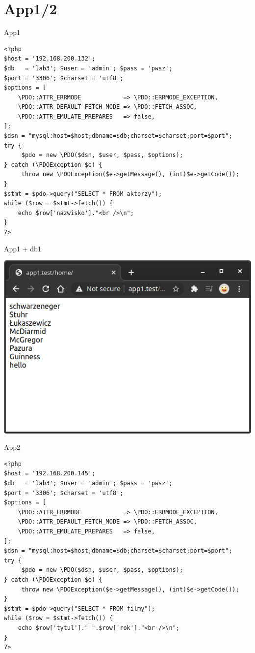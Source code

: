 \documentclass[presentation]{beamer}
\begin{document}
\section{App1/2}
\label{sec:orgb65ecbc}
\begin{frame}[label={sec:org920a3f6},fragile]{App1}
 \TINY
\begin{verbatim}
<?php
$host = '192.168.200.132';
$db   = 'lab3'; $user = 'admin'; $pass = 'pwsz';
$port = '3306'; $charset = 'utf8';
$options = [
    \PDO::ATTR_ERRMODE            => \PDO::ERRMODE_EXCEPTION,
    \PDO::ATTR_DEFAULT_FETCH_MODE => \PDO::FETCH_ASSOC,
    \PDO::ATTR_EMULATE_PREPARES   => false,
];
$dsn = "mysql:host=$host;dbname=$db;charset=$charset;port=$port";
try {
     $pdo = new \PDO($dsn, $user, $pass, $options);
} catch (\PDOException $e) {
     throw new \PDOException($e->getMessage(), (int)$e->getCode());
}
$stmt = $pdo->query("SELECT * FROM aktorzy");
while ($row = $stmt->fetch()) {
    echo $row['nazwisko']."<br />\n";
}
?>
\end{verbatim}
\end{frame}
\begin{frame}[label={sec:org1907d78}]{App1 + db1}
\begin{center}
\includegraphics[width=.9\linewidth]{./data/app/app1.png}
\end{center}
\end{frame}
\begin{frame}[label={sec:orgbbcd1e8},fragile]{App2}
 \TINY
\begin{verbatim}
<?php
$host = '192.168.200.145';
$db   = 'lab3'; $user = 'admin'; $pass = 'pwsz';
$port = '3306'; $charset = 'utf8';
$options = [
    \PDO::ATTR_ERRMODE            => \PDO::ERRMODE_EXCEPTION,
    \PDO::ATTR_DEFAULT_FETCH_MODE => \PDO::FETCH_ASSOC,
    \PDO::ATTR_EMULATE_PREPARES   => false,
];
$dsn = "mysql:host=$host;dbname=$db;charset=$charset;port=$port";
try {
     $pdo = new \PDO($dsn, $user, $pass, $options);
} catch (\PDOException $e) {
     throw new \PDOException($e->getMessage(), (int)$e->getCode());
}
$stmt = $pdo->query("SELECT * FROM filmy");
while ($row = $stmt->fetch()) {
    echo $row['tytul']." ".$row['rok']."<br />\n";
}
?>
\end{verbatim}
\end{frame}
\end{document}
